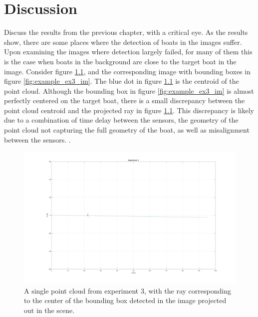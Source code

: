 
\chapter{Discussion}
Discuss the results from the previous chapter, with a critical eye.
As the results show, there are some places where the detection of boats in the images suffer. Upon examining the images where detection largely failed, for many of them this is the case when boats in the background are close to the target boat in the image.
Consider figure \ref{fig:example_ex3_pc}, and the corresponding image with bounding boxes in figure \ref{fig:example_ex3_im}. The blue dot in figure \ref{fig:example_ex3_pc} is the centroid of the point cloud. Although the bounding box in figure \ref{fig:example_ex3_im} is almost perfectly centered on the target boat, there is a small discrepancy between the point cloud centroid and the projected ray in figure \ref{fig:example_ex3_pc}. This discrepancy is likely due to a combination of time delay between the sensors, the geometry of the point cloud not capturing the full geometry of the boat, as well as misalignment between the sensors. .
\begin{figure}[H]
	\centering
	\includegraphics[width=\linewidth]{fig/example_1_pc.png}
	\caption{A single point cloud from experiment 3, with the ray corresponding to the center of the bounding box detected in the image projected out in the scene.}
	\label{fig:example_ex3_pc}
\end{figure}

